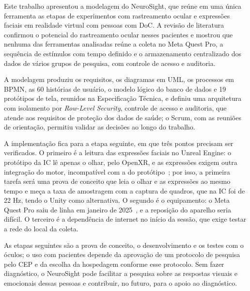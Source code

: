 \documentclass[conference,a4paper,10pt]{IEEEtran}
\begin{document}
Este trabalho apresentou a modelagem do NeuroSight, que reúne em uma única ferramenta as etapas de experimentos com rastreamento ocular e expressões faciais em realidade virtual com pessoas com DoC. A revisão de literatura confirmou o potencial do rastreamento ocular nesses pacientes e mostrou que nenhuma das ferramentas analisadas reúne a coleta no Meta Quest Pro, a sequência de estímulos com tempo definido e o armazenamento centralizado dos dados de vários grupos de pesquisa, com controle de acesso e auditoria.

A modelagem produziu os requisitos, os diagramas em UML, os processos em BPMN, as 60 histórias de usuário, o modelo lógico do banco de dados e 19 protótipos de tela, reunidos na Especificação Técnica, e definiu uma arquitetura com isolamento por \textit{Row-Level Security}, controle de acesso e auditoria, que atende aos requisitos de proteção dos dados de saúde; o Scrum, com as reuniões de orientação, permitiu validar as decisões ao longo do trabalho.

A implementação fica para a etapa seguinte, em que três pontos precisam ser verificados. O primeiro é a leitura das expressões faciais no Unreal Engine: o protótipo da IC lê apenas o olhar, pelo OpenXR, e as expressões exigem outra integração do motor, incompatível com a do protótipo~\cite{IC}; por isso, a primeira tarefa será uma prova de conceito que leia o olhar e as expressões ao mesmo tempo e meça a taxa de amostragem com a captura de quadros, que na IC foi de 22 Hz, tendo o Unity como alternativa. O segundo é o equipamento: o Meta Quest Pro saiu de linha em janeiro de 2025~\cite{HAYDEN}, e a reposição do aparelho seria difícil. O terceiro é a dependência de internet no início da sessão, que exige testar a rede do local da coleta.

As etapas seguintes são a prova de conceito, o desenvolvimento e os testes com o óculos; o uso com pacientes depende da aprovação de um protocolo de pesquisa pelo CEP e da escolha da hospedagem conforme esse protocolo. Sem fazer diagnóstico, o NeuroSight pode facilitar a pesquisa sobre as respostas visuais e emocionais dessas pessoas e contribuir, no futuro, para o apoio ao diagnóstico.



\def\refname{Referências}
\end{document}
